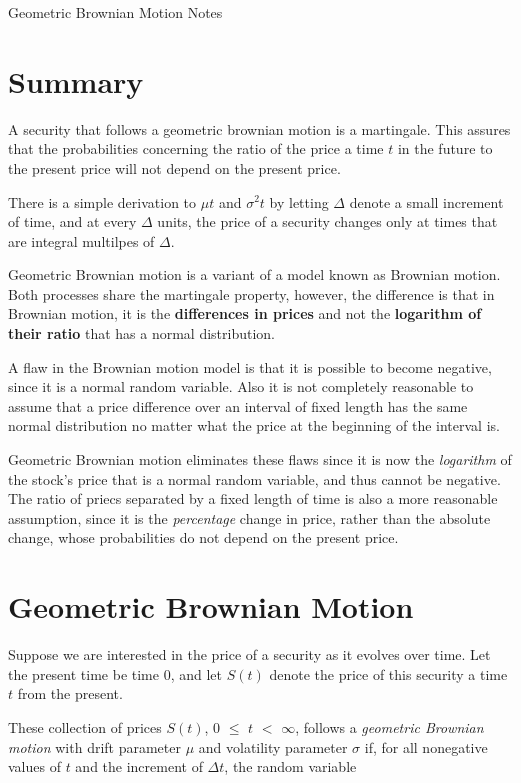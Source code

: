 \documentclass[12pt]{article}
\begin{document}
\begin{center}
    \Large Geometric Brownian Motion Notes
\end{center}

\section{Summary}

A security that follows a geometric brownian motion is a martingale. This assures that the probabilities concerning the ratio of the price a time $t$ in the future to the present price will not depend on the present price.

There is a simple derivation to $\mu t$ and $\sigma^2 t$ by letting $\Delta$ denote a small increment of time, and at every $\Delta$ units, the price of a security changes only at times that are integral multilpes of $\Delta$.

Geometric Brownian motion is a variant of a model known as Brownian motion. Both processes share the martingale property, however, the difference is that in Brownian motion, it is the \textbf{differences in prices} and not the \textbf{logarithm of their ratio} that has a normal distribution.

A flaw in the Brownian motion model is that it is possible to become negative, since it is a normal random variable. Also it is not completely reasonable to assume that a price difference over an interval of fixed length has the same normal distribution no matter what the price at the beginning of the interval is.

Geometric Brownian motion eliminates these flaws since it is now the \textit{logarithm} of the stock's price that is a normal random variable, and thus cannot be negative. The ratio of priecs separated by a fixed length of time is also a more reasonable assumption, since it is the \textit{percentage} change in price, rather than the absolute change, whose probabilities do not depend on the present price.

\section{Geometric Brownian Motion}

Suppose we are interested in the price of a security as it evolves over time. Let the present time be time 0, and let $S(t)$ denote the price of this security a time $t$ from the present.

These collection of prices $S(t)$, 0 $\leq$ $t$ $<$ $\infty$, follows a \textit{geometric Brownian motion} with drift parameter $\mu$ and volatility parameter $\sigma$ if, for all nonegative values of $t$ and the increment of $\Delta t$, the random variable
\end{document}
